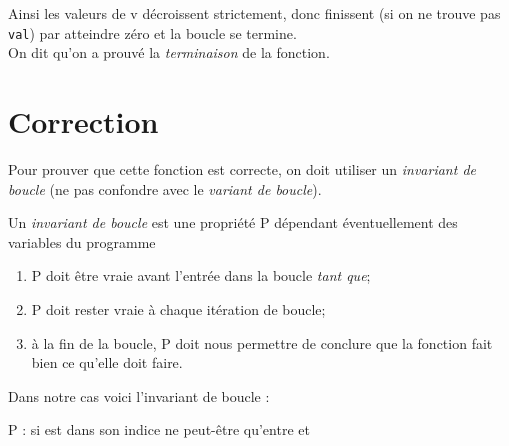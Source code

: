 Ainsi les valeurs de v décroissent strictement, donc finissent (si on ne trouve pas \texttt{val}) par atteindre zéro et la boucle se termine.\\
On dit qu'on a prouvé la \textit{terminaison} de la fonction.

\section{Correction}

Pour prouver que cette fonction est correcte, on doit utiliser un \textit{invariant de boucle} (ne pas confondre avec le \textit{variant de boucle}).

\begin{definition}[]
Un \textit{invariant de boucle} est une propriété P dépendant éventuellement des variables du programme
\begin{enumerate}[--]
    \item   P doit être vraie avant l'entrée dans la boucle \textit{tant que};
    \item   P doit rester vraie à chaque itération de boucle;
    \item   à la fin de la boucle, P doit nous permettre de conclure que la fonction \og fait bien ce qu'elle doit faire\fg{}.
\end{enumerate}
\end{definition}


Dans notre cas voici l'invariant de boucle :
\begin{center}
P : \og si  est dans  son indice ne peut-être qu'entre  et \fg{}
\end{center}

